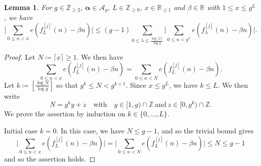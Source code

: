\documentclass[hidelinks]{amsart}
\numberwithin{equation}{section}
\theoremstyle{plain}
\newtheorem{lemma}{Lemma}
\theoremstyle{definition}
\newcommand{\prooftitle}[1]{\noindent\textsf{#1}}
\begin{document}
\begin{lemma}
\label{lem:sum_cleanup}
For $g\in\mathbb{Z}_{\ge2}$,
$\bm{\alpha}\in\mathscr{A}_{g}$,
$L\in\mathbb{Z}_{\ge0}$, $x\in\mathbb{R}_{\ge1}$ and $\beta\in\mathbb{R}$
with $1\le x\le g^{L}$, we have
\[
\biggl|
\sum_{0\le n<x}
e(f_{L}^{[j]}(n)-\beta n)
\biggr|
\le
(g-1)
\sum_{0\le\lambda\le\frac{\log\lceil x\rceil}{\log g}}
\biggl|
\sum_{0\le n<g^{\lambda}}
e(f_{\lambda}^{[j]}(n)-\beta n)
\biggr|.
\]
\end{lemma}
\begin{proof}
Let $N\coloneqq\lceil x\rceil\ge1$. We then have
\begin{equation}
\label{lem:sum_cleanup:x_to_N}
\sum_{0\le n<x}
e(f_{L}^{[j]}(n)-\beta n)
=
\sum_{0\le n<N}
e(f_{L}^{[j]}(n)-\beta n).
\end{equation}
Let $k\coloneqq[\frac{\log N}{\log g}]$ so that $g^{k}\le N<g^{k+1}$.
Since $x\le g^{L}$, we have $k\le L$. We then write
\begin{equation}
\label{lem:sum_cleanup:long_division}
N=g^{k}y+z
\quad\text{with}\quad
y\in[1,g)\cap\mathbb{Z}
\ \text{and}\ 
z\in[0,g^{k})\cap\mathbb{Z}.
\end{equation}
We prove the assertion by induction on $k\in\{0,\ldots,L\}$.
\medskip

\prooftitle{Initial case $k=0$.}
In this case, we have $N\le g-1$, and so the trivial bound gives
\[
\biggl|
\sum_{0\le n<x}
e(f_{L}^{[j]}(n)-\beta n)
\biggr|
=
\biggl|
\sum_{0\le n<N}
e(f_{L}^{[j]}(n)-\beta n)
\biggr|
\le
N
\le
g-1
\]
and so the assertion holds. 
\medskip


\end{proof}
\end{document}
